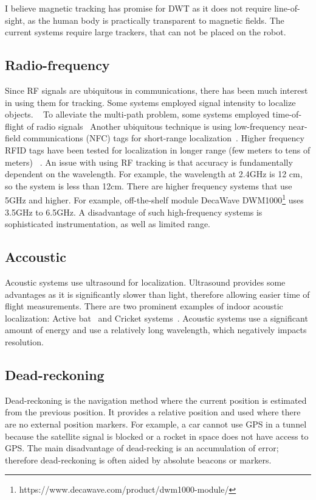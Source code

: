 I believe magnetic tracking has promise for DWT as it does not require line-of-sight, as the human body is practically transparent to magnetic fields. The current systems require large trackers, that can not be placed on the robot. 

\subsection{Radio-frequency}
Since RF signals are ubiquitous in communications, there has been much interest in using them for tracking.
Some systems employed signal intensity to localize objects.  ~\cite{hightower2000spoton}
To alleviate the multi-path problem, some systems employed time-of-flight of radio signals~\cite{adib20143d}
Another ubiquitous technique is using low-frequency near-field communications (NFC)  tags for short-range localization~\cite{villar2018project}. Higher frequency RFID tags have been tested for localization in longer range (few meters to tens of meters) ~\cite{digiampaolo2012passive,ni2003landmarc}. 
An issue with using RF tracking is that accuracy is fundamentally dependent on the wavelength. For example, the wavelength at 2.4GHz is 12 cm, so the system is less than 12cm. There are higher frequency systems that use 5GHz and higher. For example, off-the-shelf module DecaWave DWM1000\footnote{https://www.decawave.com/product/dwm1000-module/} uses 3.5GHz to 6.5GHz. A disadvantage of such high-frequency systems is sophisticated instrumentation, as well as limited range. 

\subsection{Accoustic}
Acoustic systems use ultrasound for localization. Ultrasound provides some advantages as it is significantly slower than light, therefore allowing easier time of flight measurements. There are two prominent examples of indoor acoustic localization: Active bat~\cite{harter2002anatomy} and Cricket systems~\cite{priyantha2000cricket}. Acoustic systems use a significant amount of energy and use a relatively long wavelength, which negatively impacts resolution. 

\subsection{Dead-reckoning}
Dead-reckoning is the navigation method where the current position is estimated from the previous position. It provides a relative position and used where there are no external position markers. For example, a car cannot use GPS in a tunnel because the satellite signal is blocked or a rocket in space does not have access to GPS. The main disadvantage of dead-recking is an accumulation of error; therefore dead-reckoning is often aided by absolute beacons or markers. 

